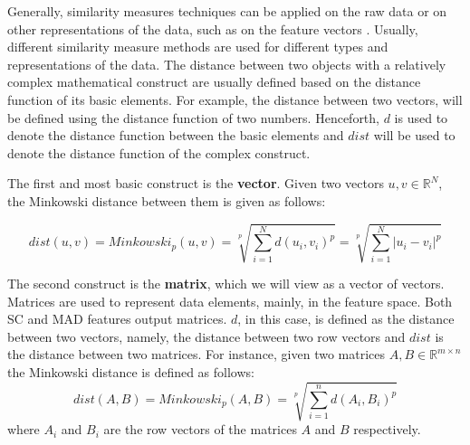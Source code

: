 \iftoggle{edit-mode}{\hspace{0pt}\marginpar{Different Representations}}{}
Generally, similarity measures techniques can be applied on the raw data or on other representations of the data, such as on the feature vectors \cite{chen2005similarity}. 
Usually, different similarity measure methods are used for different types and representations of the data. 
The distance between two objects with a relatively complex mathematical construct are usually defined based on the distance function of its basic elements. 
For example, the distance between two vectors, will be defined using the distance function of two numbers. 
Henceforth, $d$ is used to denote the distance function between the basic elements and $dist$ will be used to denote the distance function of the complex construct.

\iftoggle{edit-mode}{\hspace{0pt}\marginpar{Vectors}}{}
The first and most basic construct is the \textbf{vector}. Given two vectors $u,v \in \mathbb{R}^{N}$, the Minkowski distance between them is given as follows:

\begin{equation}
dist(u,v)=Minkowski_p(u,v)=\sqrt[p]{\sum\limits_{i=1}^N d(u_i,v_i)^p}=\sqrt[p]{\sum\limits_{i=1}^N |u_i-v_i|^p}
\label{eq:minkowski}
\end{equation}

\iftoggle{edit-mode}{\hspace{0pt}\marginpar{Matrices}}{}
The second construct is the \textbf{matrix}, which we will view as a vector of vectors. Matrices are used to represent data elements, mainly, in the feature space. Both SC and MAD features output matrices. $d$, in this case, is defined as the distance between two vectors, namely, the distance between two row vectors and $dist$ is the distance between two matrices. For instance, given two matrices $A,B \in \mathbb{R}^{m \times n}$ the Minkowski distance is defined as follows:
\begin{equation}
dist(A,B) = Minkowski_p(A,B)=\sqrt[p]{\sum\limits_{i=1}^n d(A_i,B_i)^p}
\end{equation}
where $A_i$ and $B_i$ are the row vectors of the matrices $A$ and $B$ respectively.


